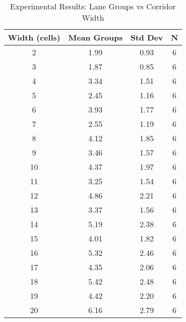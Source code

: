 \begin{table}[h]
\centering
\caption{Experimental Results: Lane Groups vs Corridor Width}
\label{tab:lanes_by_width}
\begin{tabular}{cccc}
\hline
Width (cells) & Mean Groups & Std Dev & N \\
\hline
2 & 1.99 & 0.93 & 6 \\
3 & 1.87 & 0.85 & 6 \\
4 & 3.34 & 1.51 & 6 \\
5 & 2.45 & 1.16 & 6 \\
6 & 3.93 & 1.77 & 6 \\
7 & 2.55 & 1.19 & 6 \\
8 & 4.12 & 1.85 & 6 \\
9 & 3.46 & 1.57 & 6 \\
10 & 4.37 & 1.97 & 6 \\
11 & 3.25 & 1.54 & 6 \\
12 & 4.86 & 2.21 & 6 \\
13 & 3.37 & 1.56 & 6 \\
14 & 5.19 & 2.38 & 6 \\
15 & 4.01 & 1.82 & 6 \\
16 & 5.32 & 2.46 & 6 \\
17 & 4.35 & 2.06 & 6 \\
18 & 5.42 & 2.48 & 6 \\
19 & 4.42 & 2.20 & 6 \\
20 & 6.16 & 2.79 & 6 \\
\hline
\end{tabular}
\end{table}
